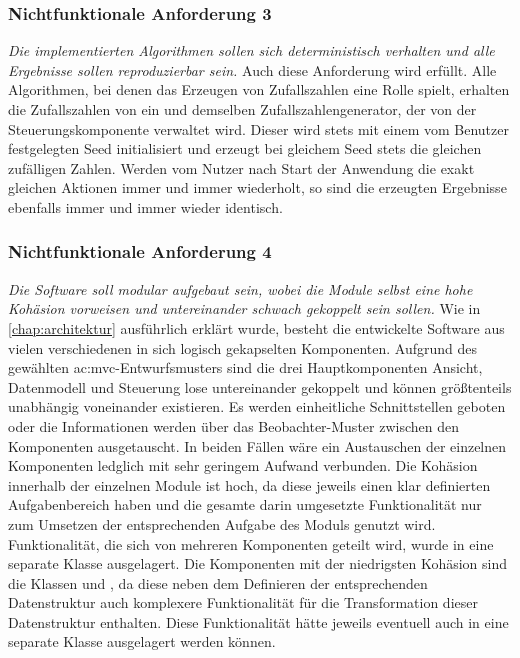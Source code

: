 \subsubsection{Nichtfunktionale Anforderung 3}
\textit{Die implementierten Algorithmen sollen sich deterministisch verhalten und alle Ergebnisse sollen reproduzierbar sein.} Auch diese Anforderung
wird erfüllt. Alle Algorithmen, bei denen das Erzeugen von Zufallszahlen eine Rolle spielt, erhalten die Zufallszahlen von ein und demselben
Zufallszahlengenerator, der von der Steuerungskomponente verwaltet wird. Dieser wird stets mit einem vom Benutzer festgelegten Seed initialisiert und
erzeugt bei gleichem Seed stets die gleichen zufälligen Zahlen. Werden vom Nutzer nach Start der Anwendung die exakt gleichen Aktionen immer und immer
wiederholt, so sind die erzeugten Ergebnisse ebenfalls immer und immer wieder identisch.

\subsubsection{Nichtfunktionale Anforderung 4}
\textit{Die Software soll modular aufgebaut sein, wobei die Module selbst eine hohe Kohäsion vorweisen und untereinander schwach gekoppelt sein sollen.}
Wie in \autoref{chap:architektur} ausführlich erklärt wurde, besteht die entwickelte Software aus vielen verschiedenen in sich logisch gekapselten Komponenten.
Aufgrund des gewählten \gls{ac:mvc}-Entwurfsmusters sind die drei Hauptkomponenten Ansicht, Datenmodell und Steuerung lose untereinander gekoppelt und können
größtenteils unabhängig voneinander existieren. \cite{48_bucanek} Es werden einheitliche Schnittstellen geboten oder die Informationen werden über das Beobachter-Muster
zwischen den Komponenten ausgetauscht. In beiden Fällen wäre ein Austauschen der einzelnen Komponenten ledglich mit sehr geringem Aufwand verbunden. Die
Kohäsion innerhalb der einzelnen Module ist hoch, da diese jeweils einen klar definierten Aufgabenbereich haben und die gesamte darin umgesetzte Funktionalität
nur zum Umsetzen der entsprechenden Aufgabe des Moduls genutzt wird. Funktionalität, die sich von mehreren Komponenten geteilt wird, wurde in eine separate
Klasse  ausgelagert. Die Komponenten mit der niedrigsten Kohäsion sind die Klassen  und , da diese neben dem
Definieren der entsprechenden Datenstruktur auch komplexere Funktionalität für die Transformation dieser Datenstruktur enthalten. Diese Funktionalität
hätte jeweils eventuell auch in eine separate Klasse ausgelagert werden können.

